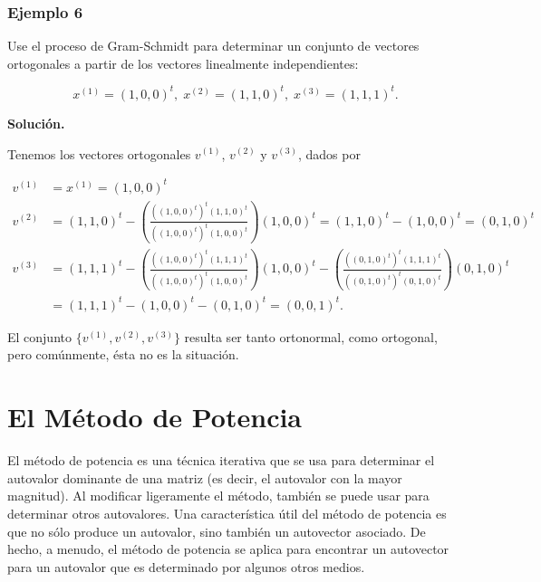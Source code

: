 \documentclass[12pt, a4paper]{article}
\numberwithin{subsection}{section} %
\begin{document}
        \subsubsection*{Ejemplo 6}
        
            Use el proceso de Gram-Schmidt para determinar un conjunto de vectores ortogonales a partir de los vectores linealmente independientes:
        
            $$x^{(1)} = (1, 0, 0)^t, \; x^{(2)} = (1, 1, 0)^t, \; x^{(3)} = (1, 1, 1)^t.$$
        
            {\bf Solución.}
        
            Tenemos los vectores ortogonales $v^{(1)}$, $v^{(2)}$ y $v^{(3)}$, dados por
        
            \begin{align*}
                v^{(1)} &= x^{(1)} = (1, 0, 0)^t \\
                v^{(2)} &= (1, 1, 0)^t - \left(\frac{((1, 0, 0)^t)^t (1, 1, 0)^t}{((1, 0, 0)^t)^t (1, 0, 0)^t}\right) (1, 0, 0)^t = (1, 1, 0)^t - (1, 0, 0)^t = (0, 1, 0)^t \\
                v^{(3)} &= (1, 1, 1)^t - \left(\frac{((1, 0, 0)^t)^t (1, 1, 1)^t}{((1, 0, 0)^t)^t (1, 0, 0)^t}\right)(1, 0, 0)^t - \left(\frac{((0, 1, 0)^t)^t (1, 1, 1)^t}{((0, 1, 0)^t)^t (0, 1, 0)^t}\right)(0, 1, 0)^t \\
                &= (1, 1, 1)^t - (1, 0, 0)^t - (0, 1, 0)^t = (0, 0, 1)^t.
            \end{align*}
        
            El conjunto $\{v^{(1)}, v^{(2)}, v^{(3)}\}$ resulta ser tanto ortonormal, como ortogonal, pero comúnmente, ésta no es la situación.
    
    \section{\textnormal{El Método de Potencia}}
    
        El método de potencia es una técnica iterativa que se usa para determinar el autovalor dominante de una matriz (es decir, el autovalor con la mayor magnitud). Al modificar ligeramente el método, también se puede usar para determinar otros autovalores. Una característica útil del método de potencia es que no sólo produce un autovalor, sino también un autovector asociado. De hecho, a menudo, el método de potencia se aplica para encontrar un autovector para un autovalor que es determinado por algunos otros medios.
        
\end{document}

